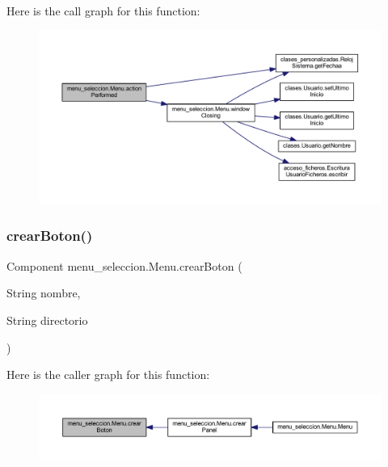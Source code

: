 Here is the call graph for this function\+:
\nopagebreak
\begin{figure}[H]
\begin{center}
\leavevmode
\includegraphics[width=350pt]{classmenu__seleccion_1_1_menu_a7a403c4df99f7687b71b83b698dbb678_cgraph}
\end{center}
\end{figure}
\mbox{\label{classmenu__seleccion_1_1_menu_ab90e5b1e7893fc1321b9a3394d3d9d6c}} 
\subsubsection{\texorpdfstring{crear\+Boton()}{crearBoton()}}
{\footnotesize\ttfamily Component menu\+\_\+seleccion.\+Menu.\+crear\+Boton (\begin{DoxyParamCaption}\item[{String}]{nombre,  }\item[{String}]{directorio }\end{DoxyParamCaption})}

Here is the caller graph for this function\+:
\nopagebreak
\begin{figure}[H]
\begin{center}
\leavevmode
\includegraphics[width=350pt]{classmenu__seleccion_1_1_menu_ab90e5b1e7893fc1321b9a3394d3d9d6c_icgraph}
\end{center}
\end{figure}
\mbox{\label{classmenu__seleccion_1_1_menu_a0c343de6099f0b63a85771456a59782f}} 

